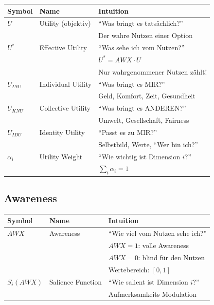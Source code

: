 \begin{longtable}{p{2cm}p{4cm}p{7cm}}
\toprule
\textbf{Symbol} & \textbf{Name} & \textbf{Intuition} \\
\midrule
\endhead

$U$ & Utility (objektiv) & 
``Was bringt es tatsächlich?'' \\
& & Der wahre Nutzen einer Option \\[6pt]

$U^*$ & Effective Utility & 
``Was sehe ich vom Nutzen?'' \\
& & $U^* = AWX \cdot U$ \\
& & Nur wahrgenommener Nutzen zählt! \\[6pt]

$U_{INU}$ & Individual Utility & 
``Was bringt es MIR?'' \\
& & Geld, Komfort, Zeit, Gesundheit \\[6pt]

$U_{KNU}$ & Collective Utility & 
``Was bringt es ANDEREN?'' \\
& & Umwelt, Gesellschaft, Fairness \\[6pt]

$U_{IDU}$ & Identity Utility & 
``Passt es zu MIR?'' \\
& & Selbstbild, Werte, ``Wer bin ich?'' \\[6pt]

$\alpha_i$ & Utility Weight & 
``Wie wichtig ist Dimension $i$?'' \\
& & $\sum_i \alpha_i = 1$ \\[6pt]

\bottomrule
\end{longtable}

\subsection{Awareness}

\begin{longtable}{p{2cm}p{4cm}p{7cm}}
\toprule
\textbf{Symbol} & \textbf{Name} & \textbf{Intuition} \\
\midrule
\endhead

$AWX$ & Awareness & 
``Wie viel vom Nutzen sehe ich?'' \\
& & $AWX = 1$: volle Awareness \\
& & $AWX = 0$: blind für den Nutzen \\
& & Wertebereich: $[0, 1]$ \\[6pt]

$S_i(AWX)$ & Salience Function & 
``Wie salient ist Dimension $i$?'' \\
& & Aufmerksamkeits-Modulation \\[6pt]

\bottomrule
\end{longtable}

